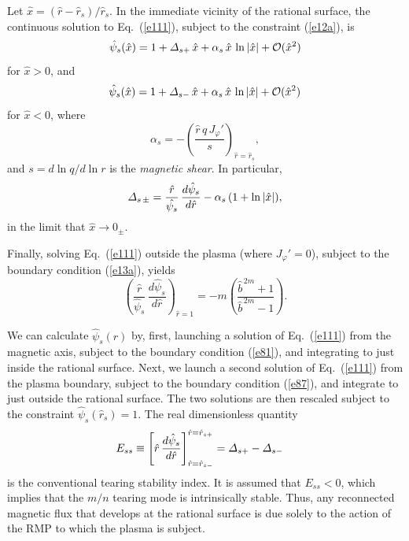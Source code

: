 \documentclass[12pt,prb,aps]{revtex4-1}
\begin{document}
Let $\hat{x} = (\hat{r}-\hat{r}_s)/\hat{r}_s$. 
In the immediate vicinity of the rational surface, the continuous solution to Eq.~(\ref{e111}), subject to the constraint 
(\ref{e12a}), is 
\begin{equation}\label{e18}
\hat{\psi}_s(\hat{x}) = 1+{\mit\Delta}_{s+}\,\hat{x} +\alpha_s\,\hat{x}\,\ln|\hat{x}| + {\cal O}(\hat{x}^2)
\end{equation}
for $\hat{x}>0$, and 
\begin{equation}\label{e19}
\hat{\psi}_s(\hat{x}) = 1+{\mit\Delta}_{s-}\,\hat{x} +\alpha_s\,\hat{x}\,\ln|\hat{x}| + {\cal O}(\hat{x}^2)
\end{equation}
for $\hat{x}<0$, where
\begin{equation}
\alpha_s = -\left(\frac{\hat{r}\,q\,J_\varphi'}{s}\right)_{\hat{r}=\hat{r}_s},
\end{equation}
and $s=d\ln q/d\ln r$ is the {\em magnetic shear}. 
In particular,
\begin{equation}\label{e86}
{\mit\Delta}_{s\,\pm} = \frac{\hat{r}}{\hat{\psi_s}}\,\frac{d\hat{\psi}_s}{d\hat{r}}-\alpha_s\,(1+\ln |\hat{x}|),
\end{equation}
in the limit that $\hat{x}\rightarrow 0_{\pm}$.

Finally, solving Eq.~(\ref{e111}) outside the plasma (where $J_\varphi'=0$), subject to the boundary condition (\ref{e13a}), yields 
\begin{equation}\label{e87}
\left(\frac{\hat{r}}{\hat{\psi}_s}\,\frac{d\hat{\psi}_s}{d\hat{r}}\right)_{\hat{r}=1} = -m\left(\frac{\hat{b}^{\,2m}+1}{\hat{b}^{\,2m}-1}\right).
\end{equation}

We can calculate $\hat{\psi}_s(\hat{r})$ by, first, launching a solution of Eq.~(\ref{e111}) from the magnetic
axis, subject to the boundary condition (\ref{e81}), and integrating to just inside the rational surface.
Next, we launch a second solution of  Eq.~(\ref{e111}) from  the plasma boundary, subject to the boundary condition (\ref{e87}),   and integrate to just outside the rational surface. The two solutions are then rescaled subject to the
constraint $\hat{\psi}_s(\hat{r}_s)=1$. The real dimensionless quantity
\begin{align}\label{e88}
E_{ss} &\equiv \left[\hat{r}\,\frac{d\hat{\psi}_s}{d\hat{r}}\right]^{\hat{r}=\hat{r}_{s+}}_{\hat{r}=\hat{r}_{s-}} ={\mit\Delta}_{s+} -{\mit\Delta}_{s-}
\end{align}
is the  conventional tearing stability index.\cite{fkr} It is assumed that $E_{ss}<0$, which implies that the $m/n$ tearing mode is intrinsically stable. Thus, any reconnected magnetic flux that develops at the rational surface is
due solely to the action of the RMP to which the plasma is subject.
\end{document}
